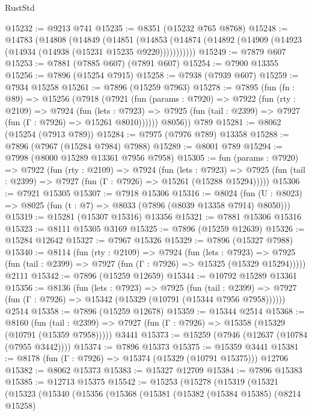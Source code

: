 \begin{lexlean}{RustStd}
\begin{coremodule}
@15232 := @9213 @741
@15235 := @8351 (@15232 @765 @8768)
@15248 := @14783
    (@14808
      (@14849
        (@14851
          (@14853 (@14874 (@14892 (@14909 (@14923 (@14934 (@14938 (@15231 @15235 @9220)))))))))))
@15249 := @7879 @607
@15253 := @7881 (@7885 @607) (@7891 @607)
@15254 := @7900 @13355
@15256 := @7896 (@15254 @7915)
@15258 := @7938 (@7939 @607)
@15259 := @7934 @15258
@15261 := @7896 (@15259 @7963)
@15278 := @7895
    (fun (fn : @89) =>
    @15256
      (@7918
        (@7921
          (fun (params : @7920) =>
          @7922
            (fun (rty : @2109) =>
            @7924
              (fun (lets : @7923) =>
              @7925 (fun (tail : @2399) => @7927 (fun (Γ : @7926) => @15261 @8010))))))
        @8056))
    @789
@15281 := @8062 (@15254 (@7913 @789))
@15284 := @7975 (@7976 @789) @13358
@15288 := @7896 (@7967 (@15284 @7984) @7988)
@15289 := @8001 @789
@15294 := @7998 (@8000 @15289 @13361 @7956 @7958)
@15305 := fun (params : @7920) =>
  @7922
    (fun (rty : @2109) =>
    @7924
      (fun (lets : @7923) =>
      @7925 (fun (tail : @2399) => @7927 (fun (Γ : @7926) => @15261 (@15288 @15294)))))
@15306 := @7921 @15305
@15307 := @7918 @15306
@15316 := @8024
    (fun (U : @8023) => @8025 (fun (t : @7) => @8033 (@7896 (@8039 @13358 @7914) @8050)))
@15319 := @15281 (@15307 @15316) @13356
@15321 := @7881 @15306 @15316
@15323 := @8111 @15305 @3169
@15325 := @7896 (@15259 @12639)
@15326 := @15284 @12642
@15327 := @7967 @15326
@15329 := @7896 (@15327 @7988)
@15340 := @8114
    (fun (rty : @2109) =>
    @7924
      (fun (lets : @7923) =>
      @7925 (fun (tail : @2399) => @7927 (fun (Γ : @7926) => @15325 (@15329 @15294)))))
    @2111
@15342 := @7896 (@15259 @12659)
@15344 := @10792 @15289 @13361
@15356 := @8136
    (fun (lets : @7923) =>
    @7925
      (fun (tail : @2399) =>
      @7927 (fun (Γ : @7926) => @15342 (@15329 (@10791 (@15344 @7956 @7958))))))
    @2514
@15358 := @7896 (@15259 @12678)
@15359 := @15344 @2514
@15368 := @8160
    (fun (tail : @2399) => @7927 (fun (Γ : @7926) => @15358 (@15329 (@10791 (@15359 @7958)))))
    @3441
@15373 := @15259 (@7946 (@12637 (@10784 (@7955 @3442))))
@15374 := @7896 @15373
@15375 := @15359 @3441
@15381 := @8178 (fun (Γ : @7926) => @15374 (@15329 (@10791 @15375))) @12706
@15382 := @8062 @15373
@15383 := @15327 @12709
@15384 := @7896 @15383
@15385 := @12713 @15375
@15542 := @15253
    (@15278
      (@15319
        (@15321
          (@15323
            (@15340
              (@15356
                (@15368
                  (@15381
                    (@15382
                      (@15384 @15385)
                      (@8214 @15258)

\end{coremodule}
\end{lexlean}
